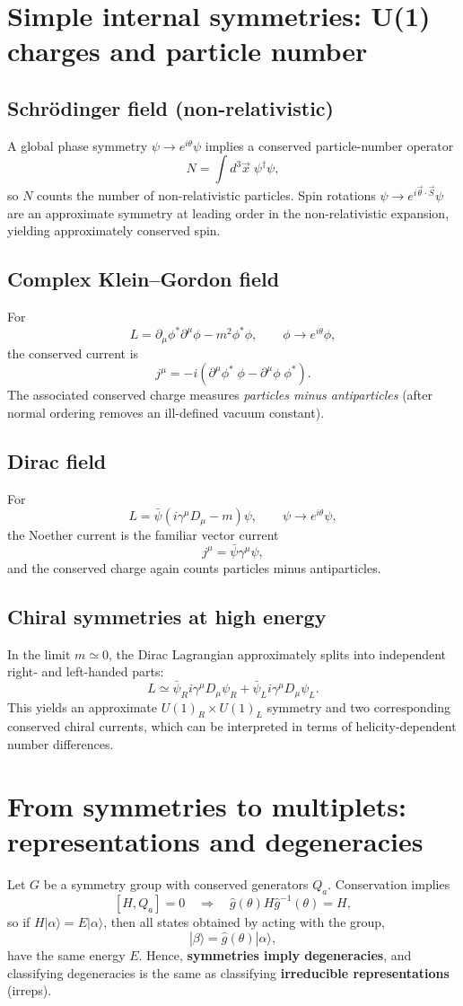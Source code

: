 \section{Simple internal symmetries: U(1) charges and particle number}
\subsection{Schr\"odinger field (non-relativistic)}
A global phase symmetry $\psi\to e^{i\theta}\psi$ implies a conserved particle-number operator
\[
N=\int d^3\vec x\;\psi^\dagger\psi,
\]
so $N$ counts the number of non-relativistic particles. Spin rotations $\psi\to e^{i\vec\theta\cdot \vec S}\psi$ are an approximate symmetry at leading order in the non-relativistic expansion, yielding approximately conserved spin.

\subsection{Complex Klein--Gordon field}
For
\[
L=\partial_\mu\phi^*\partial^\mu\phi - m^2\phi^*\phi,
\qquad
\phi\to e^{i\theta}\phi,
\]
the conserved current is
\[
j^\mu=-i\left(\partial^\mu\phi^*\;\phi-\partial^\mu\phi\;\phi^*\right).
\]
The associated conserved charge measures \emph{particles minus antiparticles} (after normal ordering removes an ill-defined vacuum constant).

\subsection{Dirac field}
For
\[
L=\bar\psi(i\gamma^\mu D_\mu - m)\psi,
\qquad
\psi\to e^{i\theta}\psi,
\]
the Noether current is the familiar vector current
\[
j^\mu=\bar\psi\gamma^\mu\psi,
\]
and the conserved charge again counts particles minus antiparticles.

\subsection{Chiral symmetries at high energy}
In the limit $m\simeq 0$, the Dirac Lagrangian approximately splits into independent right- and left-handed parts:
\[
L\simeq \bar\psi_R i\gamma^\mu D_\mu\psi_R + \bar\psi_L i\gamma^\mu D_\mu\psi_L.
\]
This yields an approximate $U(1)_R\times U(1)_L$ symmetry and two corresponding conserved chiral currents, which can be interpreted in terms of helicity-dependent number differences.

\section{From symmetries to multiplets: representations and degeneracies}
Let $G$ be a symmetry group with conserved generators $Q_a$. Conservation implies
\[
[H,Q_a]=0 \quad\Rightarrow\quad \hat g(\theta)H\hat g^{-1}(\theta)=H,
\]
so if $H|\alpha\rangle=E|\alpha\rangle$, then all states obtained by acting with the group,
\[
|\beta\rangle = \hat g(\theta)|\alpha\rangle,
\]
have the same energy $E$. Hence, \textbf{symmetries imply degeneracies}, and classifying degeneracies is the same as classifying \textbf{irreducible representations} (irreps).

